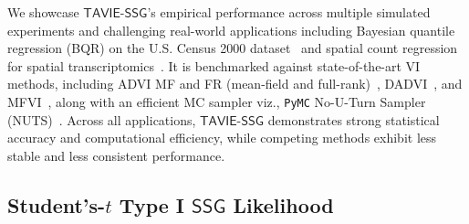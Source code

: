 \documentclass[12pt]{article}
\numberwithin{equation}{section}
\newcommand{\ssg}{\mathsf{SSG}}
\newcommand{\tssg}{\mathsf{TAVIE}\text{-}\mathsf{SSG}}
\begin{document}
We showcase $\tssg$'s empirical performance across multiple simulated experiments and challenging real-world applications including Bayesian quantile regression (BQR) on the U.S. Census 2000 dataset~\citep{yang-FastQR-pmlr} and spatial count regression for spatial transcriptomics~\citep{STARmap}. It is benchmarked against state-of-the-art VI methods, including ADVI MF and FR (mean-field and full-rank)~\citep{advi}, DADVI~\citep{dadvi}, and MFVI~\citep{mfvi-student}, along with an efficient MC sampler viz., \texttt{PyMC} {No-U-Turn Sampler} (NUTS)~\citep{pymc,pymc2023peerj}. Across all applications, $\tssg$ demonstrates strong statistical accuracy and computational efficiency, while competing methods exhibit less stable and less consistent performance.


\subsection{\texorpdfstring{Student's-$t$ Type I $\ssg$ Likelihood}{Student's-t Type I SSG Likelihood}}
\label{subsec:sim-exp-student}
\end{document}
